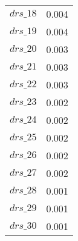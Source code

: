 \begin{center}
\begin{longtable}{cc}
$drs\_18$ 	 & 	 0.004 \\
$drs\_19$ 	 & 	 0.004 \\
$drs\_20$ 	 & 	 0.003 \\
$drs\_21$ 	 & 	 0.003 \\
$drs\_22$ 	 & 	 0.003 \\
$drs\_23$ 	 & 	 0.002 \\
$drs\_24$ 	 & 	 0.002 \\
$drs\_25$ 	 & 	 0.002 \\
$drs\_26$ 	 & 	 0.002 \\
$drs\_27$ 	 & 	 0.002 \\
$drs\_28$ 	 & 	 0.001 \\
$drs\_29$ 	 & 	 0.001 \\
$drs\_30$ 	 & 	 0.001 \\
\bottomrule%
\end{longtable}
\end{center}
